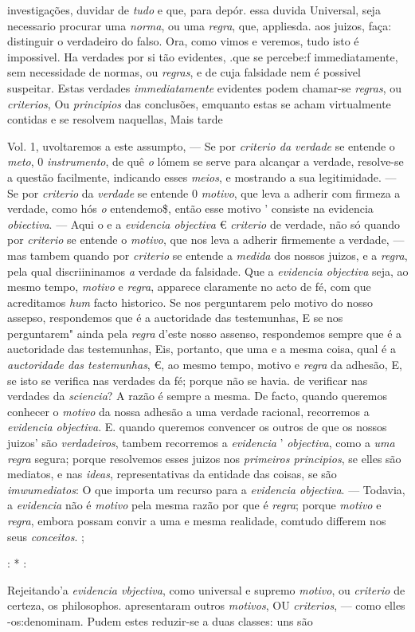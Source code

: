investigações, duvidar de \emph{tudo} e que, para depór. essa duvida Universal, seja necessario procurar uma \emph{norma}, ou uma \emph{regra}, que, appliesda. aos juizos, faça: distinguir o verdadeiro do falso. Ora, como vimos e veremos, tudo isto é impossivel. Ha verdades por si tão evidentes, .que se percebe:f immediatamente, sem necessidade de normas, ou \emph{regras}, e de cuja falsidade nem é possivel suspeitar. Estas verdades \emph{immediatamente} evidentes podem chamar-se \emph{regras}, ou \emph{criterios}, Ou \emph{principios} das conclusões, emquanto estas se acham virtualmente contidas e se resolvem naquellas, Mais tarde\par Vol. 1, uvoltaremos a este assumpto, --- Se por \emph{criterio da verdade} se entende o \emph{meto}, 0 \emph{instrumento}, de quê \emph{o} lómem se serve para alcançar a verdade, resolve-se a questão facilmente, indicando esses \emph{meios}, e mostrando a sua legitimidade. --- Se por \emph{criterio} da \emph{verdade} se entende 0 \emph{motivo}, que leva a adherir com firmeza a verdade, como hós \emph{o} entendemo\$, então esse motivo ' consiste na evidencia \emph{obiectiva}. --- Aqui o e a \emph{evidencia objectiva} € \emph{criterio} de verdade, não só quando por \emph{criterio} se entende o \emph{motivo}, que nos leva a adherir firmemente a verdade, --- mas tambem quando por \emph{criterio} se entende a \emph{medida} dos nossos juizos, e a \emph{regra}, pela qual discriininamos \emph{a} verdade da falsidade. Que a \emph{evidencia objectiva} seja, ao mesmo tempo, \emph{motivo} e \emph{regra}, apparece claramente no acto de fé, com que acreditamos \emph{hum} facto historico. Se nos perguntarem pelo motivo do nosso assepso, respondemos que é a auctoridade das testemunhas, E se nos perguntarem" ainda pela \emph{regra} d'este nosso assenso, respondemos sempre que é a auctoridade das testemunhas, Eis, portanto, que uma e a mesma coisa, qual é a \emph{auctoridade das testemunhas}, €, ao mesmo tempo, motivo e \emph{regra} da adhesão, E, se isto se verifica nas verdades da fé; porque não se havia. de verificar nas verdades da \emph{sciencia}? A razão é sempre a mesma. De facto, quando queremos conhecer o \emph{motivo} da nossa adhesão a uma verdade racional, recorremos a \emph{evidencia objectiva}. E. quando queremos convencer os outros de que os nossos juizos' são \emph{verdadeiros}, tambem recorremos a \emph{evidencia} ' \emph{objectiva}, como a \emph{uma regra} segura; porque resolvemos esses juizos nos \emph{primeiros principios}, se elles são mediatos, e nas \emph{ideas}, representativas da entidade das coisas, se são \emph{imwumediatos}: O que importa um recurso para a \emph{evidencia objectiva}. --- Todavia, a \emph{evidencia} não é \emph{motivo} pela mesma razão por que é \emph{regra}; porque \emph{motivo} e \emph{regra}, embora possam convir a uma e mesma realidade, comtudo differem nos seus \emph{conceitos}. ;\par : * :\par Rejeitando'a \emph{evidencia vbjectiva}, como universal e supremo \emph{motivo}, ou \emph{criterio} de certeza, os philosophos. apresentaram outros \emph{motivos}, OU \emph{criterios}, --- como elles -os:denominam. Pudem estes reduzir-se a duas classes: uns são 